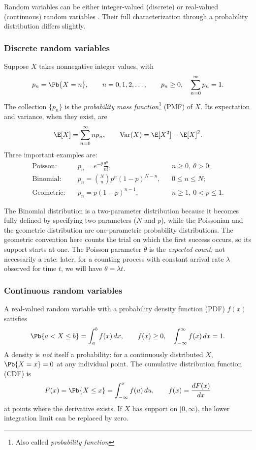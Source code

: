 Random variables can be either integer-valued (discrete) or real-valued (continuous) random variables . Their full characterization through a probability distribution differs slightly.

\subsubsection{Discrete random variables}
Suppose $X$ takes nonnegative integer values, with
\begin{equation}
 p_n=\Pb\{X=n\},\qquad n=0,1,2,\ldots,\qquad
 p_n\geq 0,\quad \sum_{n=0}^{\infty}p_n=1.
 \label{eq:basic_discrete}
\end{equation}
The collection $\{p_n\}$ is the \emph{probability mass function}\footnote{Also called {\em probability function}} (PMF) of $X$. Its expectation and variance, when they exist, are
\begin{equation}
 \E[X]=\sum_{n=0}^{\infty}np_n,\qquad
 \operatorname{Var}(X)=\E[X^2]-\E[X]^2.
 \label{eq:basic_moments}
\end{equation}
Three important examples are:
\begin{align}
 \text{Poisson:}\quad &p_n=e^{-\theta}\frac{\theta^n}{n!}, &&n\geq 0,\ \theta>0;\label{eq:basic_poisson}\\
 \text{Binomial:}\quad &p_n=\binom{N}{n}p^n(1-p)^{N-n}, &&0\leq n\leq N;\\
 \text{Geometric:}\quad &p_n=p(1-p)^{n-1}, &&n\geq 1,\ 0<p\leq1.
 \label{eq:basic_geometric}
\end{align}

The Binomial distribution is a two-parameter distribution because it becomes fully defined by specifying two parameters ($N$ and $p$), while the Poissonian and the geometric distribution are one-parametric probability distributions. The geometric convention here counts the trial on which the first success occurs, so its support starts at one. The Poisson parameter $\theta$ is the \emph{expected count}, not necessarily a rate: later, for a counting process with constant arrival rate $\lambda$ observed for time $t$, we will have $\theta=\lambda t$.

\subsubsection{Continuous random variables}
A real-valued random variable with a probability density function (PDF) $f(x)$ satisfies
\begin{equation}
 \Pb\{a<X\leq b\}=\int_a^b f(x)\,dx,\qquad
 f(x)\geq0,\quad\int_{-\infty}^{\infty}f(x)\,dx=1.
\end{equation}
A density is \emph{not} itself a probability: for a continuously distributed $X$, $\Pb\{X=x\}=0$ at any individual point. The cumulative distribution function (CDF) is
\begin{equation}
 F(x)=\Pb\{X\leq x\}=\int_{-\infty}^{x}f(u)\,du,
 \qquad f(x)=\frac{dF(x)}{dx}
 \label{eq:basic_cdf}
\end{equation}
at points where the derivative exists. If $X$ has support on $[0,\infty)$, the lower integration limit can be replaced by zero.

